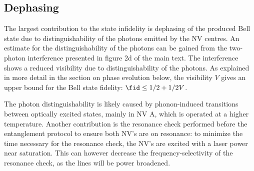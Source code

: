 
\subsection{Dephasing}
The largest contribution to the state infidelity is dephasing of the produced Bell state due to distinguishability of the photons emitted by the NV centres. An estimate for the distinguishability of the photons can be gained from the two-photon interference presented in figure 2d of the main text. The interference shows a reduced visibility due to distinguishability of the photons. As explained in more detail in the section on phase evolution below, the visibility $V$ gives an upper bound for the Bell state fidelity:
$\fid\leq 1/2 + 1/2 V$.

The photon distinguishability is likely caused by phonon-induced transitions between optically excited states, mainly in NV A, which is operated at a higher temperature. Another contribution is the resonance check performed before the entanglement protocol to ensure both NV's are on resonance: to minimize the time necessary for the resonance check, the NV's are excited with a laser power near saturation. This can however decrease the frequency-selectivity of the resonance check, as the lines will be power broadened.

